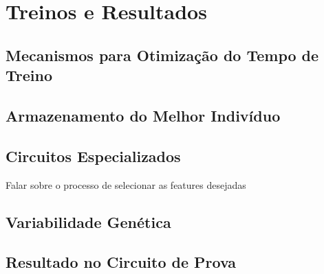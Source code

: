 \chapter{Treinos e Resultados}\label{ch11}

\section{Mecanismos para Otimização do Tempo de Treino}

\section{Armazenamento do Melhor Indivíduo}

\section{Circuitos Especializados}
Falar sobre o processo de selecionar as features desejadas

\section{Variabilidade Genética}

\section{Resultado no Circuito de Prova}


